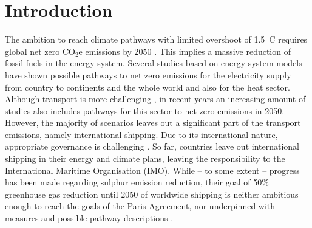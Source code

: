 \documentclass[article]{elsarticle}
\begin{document}

\section{Introduction}

The ambition to reach climate pathways with limited overshoot of 1.5~\degree C requires global net zero CO$_2$e emissions by 2050 \cite{IPCC2018}. This implies a massive reduction of fossil fuels in the energy system. Several studies based on energy system models have shown possible pathways to net zero emissions for the electricity supply from country to continents and the whole world \cite{Brown2018} and also for the heat sector. Although transport is more challenging \cite{Salvucci2018,Schafer2012}, in recent years an increasing amount of studies also includes pathways for this sector to net zero emissions in 2050. However, the majority of scenarios leaves out a significant part of the transport emissions, namely international shipping. Due to its international nature, appropriate governance is challenging \cite{GRITSENKO2017}. So far, countries leave out international shipping in their energy and climate plans, leaving the responsibility to the International Maritime Organisation (IMO). While -- to some extent -- progress has been made regarding sulphur emission reduction, their goal of 50\% greenhouse gas reduction until 2050 of worldwide shipping \cite{IMO2018} is neither ambitious enough to reach the goals of the Paris Agreement, nor underpinned with measures and possible pathway descriptions \cite{Wan2018}.
\end{document}

